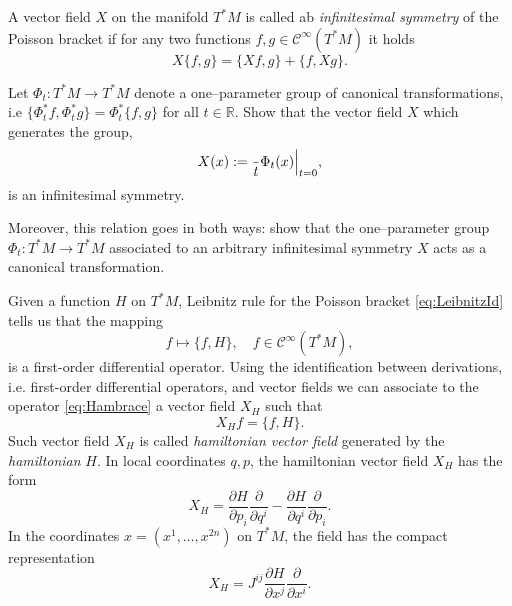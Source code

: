 \documentclass[english,fontsize=11pt,paper=a5,oneside]{scrbook}
\newcommand{\cC}{\mathcal{C}}
\newcommand{\R}{\mathbb{R}}
\let\d\relax
\DeclareMathOperator{\d}{d}
\theoremstyle{definition}
\newenvironment{exercise}
  {\pushQED{\qed}\renewcommand{\qedsymbol}{$\maltese$}\exercisex}
  {\popQED\endexercisex}
\begin{document}
\begin{tcolorbox}
    A vector field $X$ on the manifold $T^* M$ is called ab \emph{infinitesimal symmetry} of the Poisson bracket if for any two functions $f,g \in \cC^\infty(T^*M)$ it holds
    \begin{equation}\label{eq:infsymm}
        X\big\{f,g\big\} = \big\{X f, g\big\} + \big\{f, X g\big\}.
    \end{equation}
\end{tcolorbox}

\begin{exercise}\label{exe:haminfsym}
    Let $\Phi_t:T^*M \to T^*M$ denote a one--parameter group of canonical transformations, i.e $\big\{\Phi_t^* f, \Phi_t^* g\big\} = \Phi_t^*\big\{f,g\big\}$ for all $t\in\R$.
    Show that the vector field $X$ which generates the group,
    \begin{equation}
        X(x) := \frac{\d }{\d t}\Phi_t(x)\Big|_{t=0},
    \end{equation}
    is an infinitesimal symmetry.

    Moreover, this relation goes in both ways: show that the one--parameter group $\Phi_t:T^*M \to T^*M$ associated to an  arbitrary infinitesimal symmetry $X$ acts as a canonical transformation.
\end{exercise}

Given a function $H$ on $T^* M$, Leibnitz rule for the Poisson bracket \eqref{eq:LeibnitzId} tells us that the mapping
\begin{equation}\label{eq:Hambrace}
    f \mapsto \big\{f,H\big\}, \quad f\in\cC^\infty(T^*M),
\end{equation}
is a first-order differential operator.
Using the identification between derivations, i.e. first-order differential operators, and vector fields we can associate to the operator \eqref{eq:Hambrace} a vector field $X_H$ such that
\begin{equation}
    X_H f = \big\{f, H\big\}.
\end{equation}
Such vector field $X_H$ is called \emph{hamiltonian vector field} generated by the \emph{hamiltonian} $H$.
In local coordinates $q,p$, the hamiltonian vector field $X_H$ has the form
\begin{equation}
    X_H = \frac{\partial H}{\partial p_i} \frac{\partial}{\partial q^i} - \frac{\partial H}{\partial q^i}\frac{\partial}{\partial p_i}.
\end{equation}
In the coordinates $x = (x^1, \ldots, x^{2n})$ on $T^*M$, the field has the compact representation
\begin{equation}
    X_H = J^{ij}\frac{\partial H}{\partial x^j}\frac{\partial}{\partial x^i}.
\end{equation}
\end{document}

